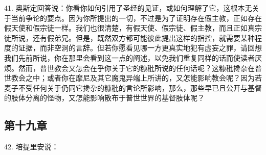 41. 奥斯定回答说：你看你如何引用了圣经的见证，或如何理解了它，这根本无关于当前争论的要点。因为你所提出的一切，不过是为了证明存在假主教，正如存在假天使和假宗徒一样。我们也很清楚，有假天使、假宗徒、假主教，而且正如真宗徒所说，还有假弟兄。但是，既然双方都可能彼此提出这样的指控，就需要某种程度的证据，而非空洞的言辞。但若你愿看见哪一方更真实地犯有虚妄之罪，请回想我们先前所说，你在那里会看到这一点的阐述，以免我们重复同样的话而使读者厌烦。然而，普世教会又怎会在乎你关于它的糠秕所说的任何话呢？这糠秕搀杂在普世教会之中；或者你在摩尼及其它魔鬼异端上所讲的，又怎能影响教会呢？因为若麦子不受任何关于仍同它搀杂的糠秕的言论所影响，那么，那些早已且公开与基督的肢体分离的怪物，又怎能影响散布于普世世界的基督肢体呢？\par


\subsection{第十九章}

42. 培提里安说：\par

